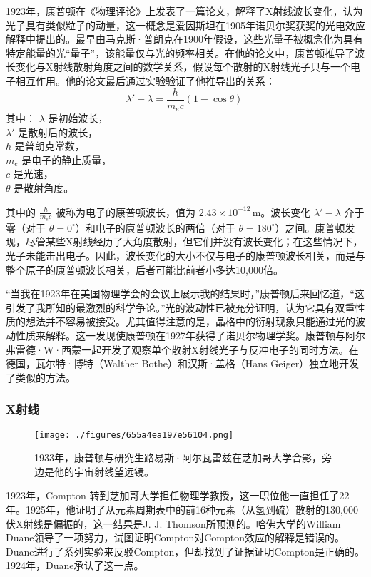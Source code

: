 1923年，康普顿在《物理评论》上发表了一篇论文，解释了X射线波长变化，认为光子具有类似粒子的动量，这一概念是爱因斯坦在1905年诺贝尔奖获奖的光电效应解释中提出的。最早由马克斯·普朗克在1900年假设，这些光量子被概念化为具有特定能量的光“量子”，该能量仅与光的频率相关。在他的论文中，康普顿推导了波长变化与X射线散射角度之间的数学关系，假设每个散射的X射线光子只与一个电子相互作用。他的论文最后通过实验验证了他推导出的关系：
\[
\lambda' - \lambda = \frac{h}{m_e c}(1 - \cos \theta)~
\]
其中：
\(\lambda\) 是初始波长，\\
\(\lambda'\) 是散射后的波长，\\
\(h\) 是普朗克常数，\\
\(m_e\) 是电子的静止质量，\\
\(c\) 是光速，\\
\(\theta\) 是散射角度。

其中的 \(\frac{h}{m_e c}\) 被称为电子的康普顿波长，值为 \(2.43 \times 10^{-12} \, \text{m}\)。波长变化 \(\lambda' - \lambda\) 介于零（对于 \(\theta = 0^\circ\)）和电子的康普顿波长的两倍（对于 \(\theta = 180^\circ\)）之间。康普顿发现，尽管某些X射线经历了大角度散射，但它们并没有波长变化；在这些情况下，光子未能击出电子。因此，波长变化的大小不仅与电子的康普顿波长相关，而是与整个原子的康普顿波长相关，后者可能比前者小多达10,000倍。

“当我在1923年在美国物理学会的会议上展示我的结果时，”康普顿后来回忆道，“这引发了我所知的最激烈的科学争论。”光的波动性已被充分证明，认为它具有双重性质的想法并不容易被接受。尤其值得注意的是，晶格中的衍射现象只能通过光的波动性质来解释。这一发现使康普顿在1927年获得了诺贝尔物理学奖。康普顿与阿尔弗雷德·W·西蒙一起开发了观察单个散射X射线光子与反冲电子的同时方法。在德国，瓦尔特·博特（Walther Bothe）和汉斯·盖格（Hans Geiger）独立地开发了类似的方法。
\subsubsection{X射线}
\begin{figure}[ht]
\centering
\texttt{[image: ./figures/655a4ea197e56104.png]}
\caption{1933年，康普顿与研究生路易斯·阿尔瓦雷兹在芝加哥大学合影，旁边是他的宇宙射线望远镜。} \label{fig_KPD_4}
\end{figure}
1923年，Compton 转到芝加哥大学担任物理学教授，这一职位他一直担任了22年。1925年，他证明了从元素周期表中的前16种元素（从氢到硫）散射的130,000伏X射线是偏振的，这一结果是J. J. Thomson所预测的。哈佛大学的William Duane领导了一项努力，试图证明Compton对Compton效应的解释是错误的。Duane进行了系列实验来反驳Compton，但却找到了证据证明Compton是正确的。1924年，Duane承认了这一点。

